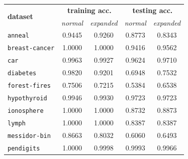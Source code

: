\documentclass[12pt]{report}
\theoremstyle{definition}
\theoremstyle{definition}
\theoremstyle{definition}
\begin{document}
\begin{table}[ht]
    \centering
    \begin{tabular}{lcccc}
    \hline
    \multicolumn{1}{l}{\multirow{2}{*}{\bf dataset}} & \multicolumn{2}{c}{\bf training acc.} & \multicolumn{2}{c}{\bf testing acc.} \\
    \multicolumn{1}{l}{} & \multicolumn{1}{p{2cm}}{\centering \it normal} & \multicolumn{1}{p{2cm}}{\centering \it expanded} & \multicolumn{1}{p{2cm}}{\centering \it normal} & \multicolumn{1}{p{2cm}}{\centering \it expanded} \\
    \hline
    \multicolumn{1}{l}{\tt anneal}        & \multicolumn{1}{c}{0.9445} & \multicolumn{1}{c}{0.9260} & \multicolumn{1}{c}{0.8773} & \multicolumn{1}{c}{0.8343} \\
    \multicolumn{1}{l}{\tt breast-cancer} & \multicolumn{1}{c}{1.0000} & \multicolumn{1}{c}{1.0000} & \multicolumn{1}{c}{0.9416} & \multicolumn{1}{c}{0.9562} \\
    \multicolumn{1}{l}{\tt car}           & \multicolumn{1}{c}{0.9963} & \multicolumn{1}{c}{0.9927} & \multicolumn{1}{c}{0.9624} & \multicolumn{1}{c}{0.9710} \\
    \multicolumn{1}{l}{\tt diabetes}      & \multicolumn{1}{c}{0.9820} & \multicolumn{1}{c}{0.9201} & \multicolumn{1}{c}{0.6948} & \multicolumn{1}{c}{0.7532} \\
    \multicolumn{1}{l}{\tt forest-fires}  & \multicolumn{1}{c}{0.7506} & \multicolumn{1}{c}{0.7215} & \multicolumn{1}{c}{0.5384} & \multicolumn{1}{c}{0.6538} \\
    \multicolumn{1}{l}{\tt hypothyroid}   & \multicolumn{1}{c}{0.9946} & \multicolumn{1}{c}{0.9930} & \multicolumn{1}{c}{0.9723} & \multicolumn{1}{c}{0.9723} \\
    \multicolumn{1}{l}{\tt ionosphere}    & \multicolumn{1}{c}{1.0000} & \multicolumn{1}{c}{1.0000} & \multicolumn{1}{c}{0.8732} & \multicolumn{1}{c}{0.8873} \\
    \multicolumn{1}{l}{\tt lymph}         & \multicolumn{1}{c}{1.0000} & \multicolumn{1}{c}{1.0000} & \multicolumn{1}{c}{0.8387} & \multicolumn{1}{c}{0.8387} \\
    \multicolumn{1}{l}{\tt messidor-bin}  & \multicolumn{1}{c}{0.8663} & \multicolumn{1}{c}{0.8032} & \multicolumn{1}{c}{0.6060} & \multicolumn{1}{c}{0.6493} \\
    \multicolumn{1}{l}{\tt pendigits}     & \multicolumn{1}{c}{1.0000} & \multicolumn{1}{c}{0.9998} & \multicolumn{1}{c}{0.9993} & \multicolumn{1}{c}{0.9966} \\

\end{tabular}
\end{table}
\end{document}
